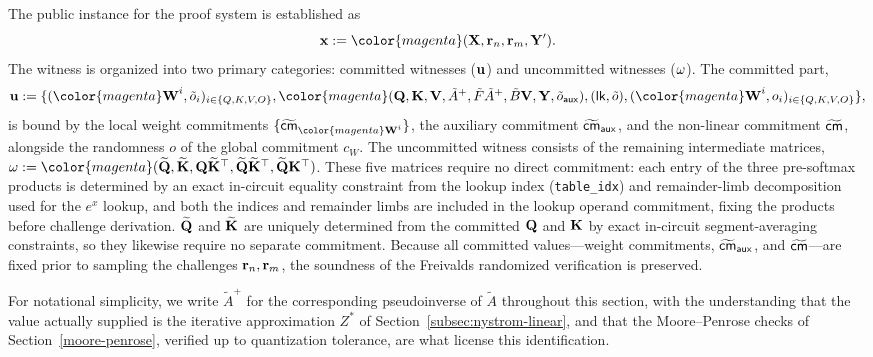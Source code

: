\documentclass[sigconf,anonymous,review,balance=false]{acmart}
\newcommand{\rev}[1]{{\color{magenta}#1}}
\begin{document}
The public instance for the proof system is established as
\[
    \ins := \rev{(\X, \rand_n, \rand_m, \Y')}.
\]
The witness is organized into two primary categories: committed witnesses (${\mathbf{u}}$) and uncommitted witnesses (${\mathbf{\omega}}$).
The committed part,
\[
    \comwit := \{ (\rev{\W}^i,\tilde{o}_i)_{i \in \{Q,K,V,O\}}, \rev{(\Q,\K,\V,\tilde{A}^{+},\tilde{F}\tilde{A}^{+},\tilde{B}\V,\Y,\tilde{o}_{\mathsf{aux}})}, (\mathsf{lk}, \tilde{o}), (\rev{\W}^i,o_i)_{i \in \{Q,K,V,O\}} \},
\]
is bound by the local weight commitments $\{\widetilde{\cm}_{\rev{\W}^i}\}$, \rev{the auxiliary commitment $\widetilde{{\sf cm}}_{\mathsf{aux}}$,} and the non-linear commitment $\widetilde{{\sf cm}}$, alongside the randomness $o$ of the global commitment $c_W$.
The uncommitted witness consists of the remaining intermediate matrices, $\uncomwit := \rev{(\widetilde{\Q}, \widetilde{\K}, \Q\widetilde{\K}^{\top}, \widetilde{\Q}\widetilde{\K}^{\top}, \widetilde{\Q}\K^{\top})}$.
\rev{These five matrices require no direct commitment: each entry of the three pre-softmax products is determined by an exact in-circuit equality constraint from the lookup index (\texttt{table\_idx}) and remainder-limb decomposition used for the $e^x$ lookup, and both the indices and remainder limbs are included in the lookup operand commitment, fixing the products before challenge derivation. $\widetilde{{\mathbf{Q}}}$ and $\widetilde{{\mathbf{K}}}$ are uniquely determined from the committed ${\mathbf{Q}}$ and ${\mathbf{K}}$ by exact in-circuit segment-averaging constraints, so they likewise require no separate commitment.}
Because all committed values---weight commitments, \rev{$\widetilde{{\sf cm}}_{\mathsf{aux}}$,} and $\widetilde{{\sf cm}}$---are fixed prior to sampling the challenges ${\mathbf{r}}_n, {\mathbf{r}}_m$, the soundness of the Freivalds randomized verification is preserved.

For notational simplicity, we write $\tilde{A}^{+}$ for the corresponding pseudoinverse of $\tilde{A}$ throughout this section, with the understanding that the value actually supplied is the iterative approximation $Z^{*}$ of Section~\ref{subsec:nystrom-linear}, and that the Moore--Penrose checks of Section~\ref{moore-penrose}, verified up to quantization tolerance, are what license this identification.
\end{document}

